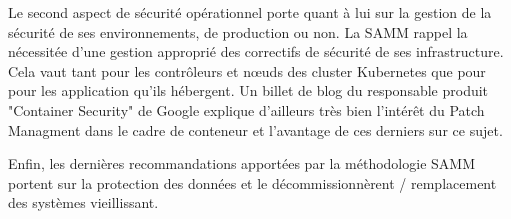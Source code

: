 Le second aspect de sécurité opérationnel porte quant à lui sur la gestion de la sécurité de ses environnements, de production ou non.
\newline La \ac{SAMM} rappel la nécessitée d'une gestion approprié des correctifs de sécurité de ses infrastructure. Cela vaut tant pour les 
contrôleurs et nœuds des cluster Kubernetes que pour pour les application qu'ils hébergent. 
\newline Un billet de blog du responsable produit "Container Security" de Google explique d'ailleurs très bien l'intérêt du Patch Managment
dans le cadre de conteneur et l'avantage de ces derniers sur ce sujet.\autocite{google_cont_sec_2018}

Enfin, les dernières recommandations apportées par la méthodologie \ac{SAMM} portent sur la protection des données et le décommissionnèrent 
/ remplacement des systèmes vieillissant.

\newpage

\section{}